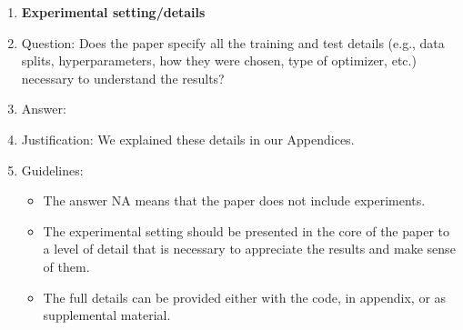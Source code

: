 \documentclass{article}
\begin{document}
\begin{enumerate}
\item {\bf Experimental setting/details}
    \item[] Question: Does the paper specify all the training and test details (e.g., data splits, hyperparameters, how they were chosen, type of optimizer, etc.) necessary to understand the results?
    \item[] Answer: \answerYes{} %
    \item[] Justification: We explained these details in our Appendices.
    \item[] Guidelines:
    \begin{itemize}
        \item The answer NA means that the paper does not include experiments.
        \item The experimental setting should be presented in the core of the paper to a level of detail that is necessary to appreciate the results and make sense of them.
        \item The full details can be provided either with the code, in appendix, or as supplemental material.
    \end{itemize}


\end{enumerate}
\end{document}
